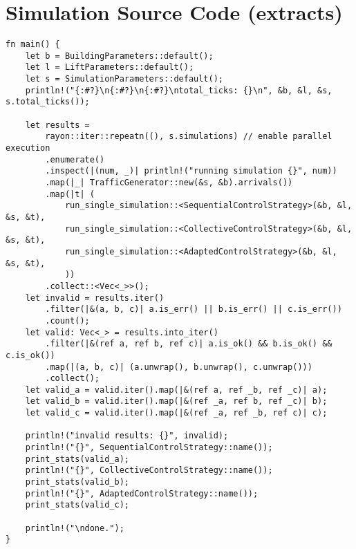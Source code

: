 
\chapter{Simulation Source Code (extracts)}
\label{app:sim}

\begin{lstlisting}[caption={Main function of the simulation program}, label={lst:app:simmain}]
fn main() {
    let b = BuildingParameters::default();
    let l = LiftParameters::default();
    let s = SimulationParameters::default();
    println!("{:#?}\n{:#?}\n{:#?}\ntotal_ticks: {}\n", &b, &l, &s, s.total_ticks());

    let results =
        rayon::iter::repeatn((), s.simulations) // enable parallel execution
        .enumerate()
        .inspect(|(num, _)| println!("running simulation {}", num))
        .map(|_| TrafficGenerator::new(&s, &b).arrivals())
        .map(|t| (
            run_single_simulation::<SequentialControlStrategy>(&b, &l, &s, &t),
            run_single_simulation::<CollectiveControlStrategy>(&b, &l, &s, &t),
            run_single_simulation::<AdaptedControlStrategy>(&b, &l, &s, &t),
            ))
        .collect::<Vec<_>>();
    let invalid = results.iter()
        .filter(|&(a, b, c)| a.is_err() || b.is_err() || c.is_err())
        .count();
    let valid: Vec<_> = results.into_iter()
        .filter(|&(ref a, ref b, ref c)| a.is_ok() && b.is_ok() && c.is_ok())
        .map(|(a, b, c)| (a.unwrap(), b.unwrap(), c.unwrap()))
        .collect();
    let valid_a = valid.iter().map(|&(ref a, ref _b, ref _c)| a);
    let valid_b = valid.iter().map(|&(ref _a, ref b, ref _c)| b);
    let valid_c = valid.iter().map(|&(ref _a, ref _b, ref c)| c);

    println!("invalid results: {}", invalid);
    println!("{}", SequentialControlStrategy::name());
    print_stats(valid_a);
    println!("{}", CollectiveControlStrategy::name());
    print_stats(valid_b);
    println!("{}", AdaptedControlStrategy::name());
    print_stats(valid_c);

    println!("\ndone.");
}
\end{lstlisting}


